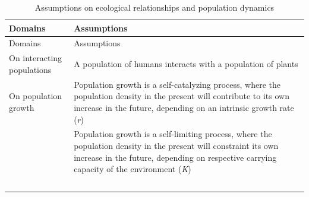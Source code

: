\documentclass[
]{book}
\begin{document}
\begin{longtable}[]{@{}ll@{}}
\caption{Assumptions on ecological relationships and population dynamics}\tabularnewline
\toprule
\begin{minipage}[b]{0.45\columnwidth}\raggedright
Domains\strut
\end{minipage} & \begin{minipage}[b]{0.49\columnwidth}\raggedright
Assumptions\strut
\end{minipage}\tabularnewline
\midrule
\endfirsthead
\toprule
\begin{minipage}[b]{0.45\columnwidth}\raggedright
Domains\strut
\end{minipage} & \begin{minipage}[b]{0.49\columnwidth}\raggedright
Assumptions\strut
\end{minipage}\tabularnewline
\midrule
\endhead
\begin{minipage}[t]{0.45\columnwidth}\raggedright
On interacting populations\strut
\end{minipage} & \begin{minipage}[t]{0.49\columnwidth}\raggedright
A population of humans interacts with a population of plants\strut
\end{minipage}\tabularnewline
\begin{minipage}[t]{0.45\columnwidth}\raggedright
On population growth\strut
\end{minipage} & \begin{minipage}[t]{0.49\columnwidth}\raggedright
Population growth is a self-catalyzing process, where the population density in the present will contribute to its own increase in the future, depending on an intrinsic growth rate (\emph{r})\strut
\end{minipage}\tabularnewline
\begin{minipage}[t]{0.45\columnwidth}\raggedright
﻿\strut
\end{minipage} & \begin{minipage}[t]{0.49\columnwidth}\raggedright
Population growth is a self-limiting process, where the population density in the present will constraint its own increase in the future, depending on respective carrying capacity of the environment (\emph{K})\strut
\end{minipage}\tabularnewline
\begin{minipage}[t]{0.45\columnwidth}\raggedright
﻿\strut
\end{minipage} & \begin{minipage}[t]{0.49\columnwidth}\raggedright

\end{minipage}
\end{longtable}
\end{document}
